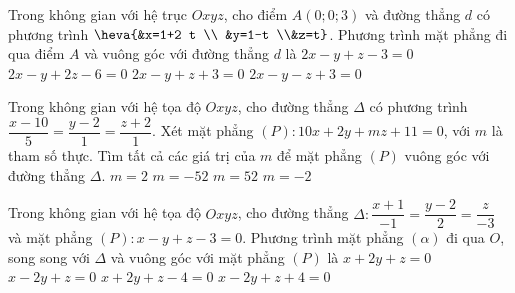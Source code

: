 \begin{ex}%
	Trong không gian với hệ trục $Oxyz$, cho điểm $A(0;0;3)$ và đường thẳng $d$ có phương trình $ \heva{&x=1+2 t \\ &y=1-t \\&z=t}$. Phương trình mặt phẳng đi qua điểm $A$ và vuông góc với đường thẳng $d$ là
	\choice
		{\True $2x-y+z-3=0$}
		{$2x-y+2 z-6=0$}
		{$2x-y+z+3=0$}
		{$2x-y-z+3=0$}
\end{ex}

\begin{ex}%
	Trong không gian với hệ tọa độ $Oxyz$, cho đường thẳng $\Delta$ có phương trình $\dfrac{x-10}{5}=\dfrac{y-2}{1}=\dfrac{z+2}{1}$. Xét mặt phẳng $(P)\colon 10x+2y+m z+11=0$, với $m$ là tham số thực. Tìm tất cả các giá trị của $m$ để mặt phẳng $(P)$ vuông góc với đường thẳng $\Delta$.
	\choice 
		{\True $m=2$}
		{$m=-52$}
		{$m=52$}
		{$m=-2$}
\end{ex}

\begin{ex}%
	Trong không gian với hệ tọa độ $Oxyz$, cho đường thẳng $\Delta\colon \dfrac{x+1}{-1}=\dfrac{y-2}{2}=\dfrac{z}{-3}$ và mặt phẳng $(P)\colon x-y+z-3=0$. Phương trình mặt phẳng $(\alpha)$ đi qua $O$, song song với $\Delta$ và vuông góc với mặt phẳng $(P)$ là
	\choice 
		{\True $x+2 y+z=0$}
		{$x-2 y+z=0$}
		{$x+2 y+z-4=0$}
		{$x-2 y+z+4=0$}
\end{ex}